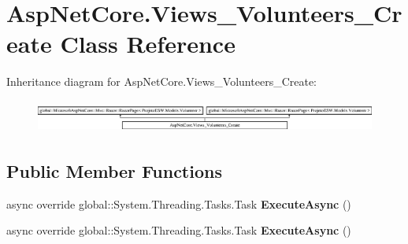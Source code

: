 \hypertarget{class_asp_net_core_1_1_views___volunteers___create}{}\section{Asp\+Net\+Core.\+Views\+\_\+\+Volunteers\+\_\+\+Create Class Reference}
\label{class_asp_net_core_1_1_views___volunteers___create}
Inheritance diagram for Asp\+Net\+Core.\+Views\+\_\+\+Volunteers\+\_\+\+Create\+:\begin{figure}[H]
\begin{center}
\leavevmode
\includegraphics[height=1.087379cm]{class_asp_net_core_1_1_views___volunteers___create}
\end{center}
\end{figure}
\subsection*{Public Member Functions}
\begin{DoxyCompactItemize}
\item 
\mbox{\label{class_asp_net_core_1_1_views___volunteers___create_aabb104617b6ac32eb28a085d52399760}} 
async override global\+::\+System.\+Threading.\+Tasks.\+Task {\bfseries Execute\+Async} ()
\item 
\mbox{\label{class_asp_net_core_1_1_views___volunteers___create_aabb104617b6ac32eb28a085d52399760}} 
async override global\+::\+System.\+Threading.\+Tasks.\+Task {\bfseries Execute\+Async} ()
\end{DoxyCompactItemize}
